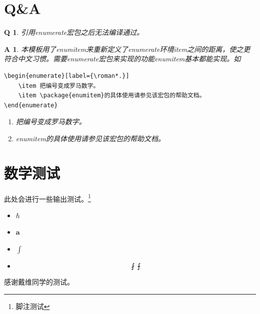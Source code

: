 \documentclass{LZU}
\newcommand{\bvec}[1]{\symbf{#1}}
\newcommand{\package}[1]{{\sffamily #1}}
\newtheorem{question}{Q}
\newtheorem*{answer}{A}
\begin{document}
\section{Q\&A}
\begin{question}
    引用\package{enumerate}宏包之后无法编译通过。
\end{question}
\begin{answer}
    本模板用了\package{enumitem}来重新定义了enumerate环境item之间的距离，使之更符合中文习惯。需要\package{enumerate}宏包来实现的功能\package{enumitem}基本都能实现。如
\begin{verbatim}
\begin{enumerate}[label={\roman*.}]
    \item 把编号变成罗马数字。
    \item \package{enumitem}的具体使用请参见该宏包的帮助文档。
\end{enumerate}
\end{verbatim}
    \begin{enumerate}[label={\roman*.}]
        \item 把编号变成罗马数字。
        \item \package{enumitem}的具体使用请参见该宏包的帮助文档。
    \end{enumerate}
\end{answer}
\section{数学测试}
此处会进行一些输出测试。\footnote{脚注测试}
\begin{itemize}
    \item $\hbar$
    \item $\bvec{a}$
    \item $\int$
    \item \[\fint\intbar\]
\end{itemize}
\Thanks
感谢戴维同学的测试。
\Grade
\end{document}

